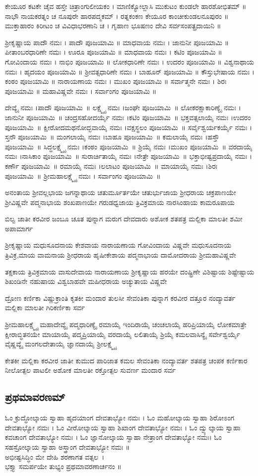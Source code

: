 ಕೇಯೂರ ಕಟಕೇ ಚೈವ ಹಸ್ತೇ ಚಿತ್ರಾಂಗುಲೀಯಕಂ । ಮಾಣಿಕ್ಯೋಲ್ಲಾಸಿ ಮುಕುಟಂ ಕುಂಡಲೇ ಹಾರಶೋಭಿತಮ್ ॥
ನಾಭೌ ನಾಯಕರತ್ನಂ ಚ ನೂಪುರೇ ಹಾರಪದ್ಮಕಮ್ । ರತ್ನಕಂಕಣ ಕೇಯೂರ ಕಾಂಚೀಕುಂಡಲನೂಪುರಂ ॥
ಮುಕ್ತಾಹಾರಂ ಕಿರೀಟಂ ಚ ವಿವಿಧಾಭರಣಾನಿ ಚ । ಗೃಹಾಣ ಭೂಷಣಂ ದೇವಿ ಸರ್ವಸಂಪತ್ಪ್ರದಾಯಿನಿ ॥

ಶ್ರೀಕೃಷ್ಣಾಯ ಪಾದೌ ನಮಃ । ಪಾದೌ ಪೂಜಯಾಮಿ ॥
ಮಾಧವಾಯ ನಮಃ । ಜಾನುನೀ ಪೂಜಯಾಮಿ ॥
ಪೀತಾಂಬರಧಾರಿಣೇ ನಮಃ । ಊರೂ ಪೂಜಯಾಮಿ ॥
ಮಾಧವಾಯ ನಮಃ । ಕಟಿಂ ಪೂಜಯಾಮಿ ॥
ಗೋವಿಂದಾಯ ನಮಃ । ನಾಭಿಂ ಪೂಜಯಾಮಿ ॥
ಲೋಕಧಾರಿಣೇ ನಮಃ । ಉದರಂ ಪೂಜಯಾಮಿ ॥
ವಿಶ್ವನಾಥಾಯ ನಮಃ । ಹೃದಯಂ ಪೂಜಯಾಮಿ ॥
ಶ್ರೀವತ್ಸಧಾರಿಣೇ ನಮಃ । ಬಾಹೂನ್ ಪೂಜಯಾಮಿ ॥
ಕೌಸ್ತುಭೇಷಾಯ ನಮಃ । ಕಂಠಂ ಪೂಜಯಾಮಿ ॥
ನಾರಾಯಣಾಯ ನಮಃ । ಮುಖಂ ಪೂಜಯಾಮಿ ॥
ಸರ್ವಾತ್ಮನೇ ನಮಃ । ಶಿರಃ ಪೂಜಯಾಮಿ ॥
ಮಹಾವಿಷ್ಣವೇ ನಮಃ । ಸರ್ವಾಂಗಂ ಪೂಜಯಾಮಿ  ॥

ದೇವ್ಯೈ ನಮಃ ।ಪಾದೌ ಪೂಜಯಾಮಿ~॥
ಲಕ್ಷ್ಮ್ಯೈ ನಮಃ ।ಜಂಘೇ ಪೂಜಯಾಮಿ~॥
ಲೋಕರಕ್ಷಾಕಾರಿಣ್ಯೈ ನಮಃ ।ಜಾನುನೀ ಪೂಜಯಾಮಿ~॥
ಚಂದ್ರಸಹೋದರ್ಯೈ ನಮಃ ।ಕಟಿಂ ಪೂಜಯಾಮಿ~॥
ಭಕ್ತವತ್ಸಲಾಯೈ ನಮಃ ।ಉದರಂ ಪೂಜಯಾಮಿ~॥
ಕ್ಷೀರೋದಮಥನೋದ್ಭವಾಯೈ ನಮಃ ।ವಕ್ಷಸ್ಥಲಂ ಪೂಜಯಾಮಿ~॥
ಸರ್ವೈಶ್ವರ್ಯಕರ್ಯೈ ನಮಃ ।ಸ್ತನೌ ಪೂಜಯಾಮಿ~॥
ಮಂಗಲಾಯೈ ನಮಃ ।ಬಾಹೂ ಪೂಜಯಾಮಿ~॥
ಕಮಲಾಯೈ ನಮಃ ।ಹಸ್ತೌ ಪೂಜಯಾಮಿ~॥
ಸಿದ್ಧಲಕ್ಷ್ಮ್ಯೈ ನಮಃ ।ಕಂಠಂ ಪೂಜಯಾಮಿ~॥
ಶ್ರಿಯೈ ನಮಃ ।ಮುಖಂ ಪೂಜಯಾಮಿ~॥
ವರದಾಯೈ ನಮಃ ।ನಾಸಿಕಾಂ ಪೂಜಯಾಮಿ~॥
ಸುರಾರ್ಚಿತಾಯೈ ನಮಃ ।ನೇತ್ರೇ ಪೂಜಯಾಮಿ~॥
ಭಕ್ತಾಭೀಷ್ಟಪ್ರದಾಯೈ ನಮಃ ।ಕರ್ಣೌ ಪೂಜಯಾಮಿ~॥
ರಮಾಯೈ ನಮಃ ।ಲಲಾಟಂ ಪೂಜಯಾಮಿ~॥
ಮಾಯಾಯೈ ನಮಃ ।ಶಿರಃ ಪೂಜಯಾಮಿ~॥
ಶ್ರೀಮಹಾಲಕ್ಷ್ಮ್ಯೈ ನಮಃ । ಸರ್ವಾಂಗಂ ಪೂಜಯಾಮಿ~॥

ಅನಂತಾಯ ಶ್ರೀವಲ್ಲಭಾಯ ಜಗನ್ನಾಥಾಯ ಚತುರ್ಮೂರ್ತಯೇ ಚತುರ್ಭುಜಾಯ ಶ್ರೀಧರಾಯ ಚಕ್ರಪಾಣಯೇ ಶ್ರೀವಿಷ್ಣವೇ ಪದ್ಮನಾಭಾಯ ಶಂಖಪಾಣಯೇ ಗರುಡಧ್ವಜಾಯ ತ್ರಿವಿಕ್ರಮಾಯ ನಾರಸಿಂಹಾಯ ಕಾಮರೂಪಾಯ

ಬಿಲ್ವ ಜಾತೀ ಕರವೀರ ಜಂಬೂ ಚೂತ  ಪುನ್ನಾಗ ಮರುಗ ದೇವದಾರು ಅಶೋಕ ಶತಪತ್ರ ಮಲ್ಲಿಕಾ ಮಾಲತೀ ಶಮೀ  ಅಪಾಮಾರ್ಗ

ಶ್ರೀಕೃಷ್ಣಾಯ ಮಧುಸೂದನಾಯ ಕೇಶವಾಯ ನಾರಾಯಣಾಯ ಗೋವಿಂದಾಯ ವಿಷ್ಣವೇ ಮಧುಸೂದನಾಯ ತ್ರಿವಿಕ್ರ,ಮಾಯ ವಾಮನಾಯ ಶ್ರೀಧರಾಯ ಹೃಷೀಕೇಶಾಯ ಪದ್ಮನಾಭಾಯ ದಾಮೋದರಾಯ ಶ್ರೀಮಹಾವಿಷ್ಣವೇ

ತಕ್ಷಕಾಯ ತ್ರಿವಿಕ್ರಮಾಯ ವಾಸುದೇವಾಯ ನಾರಾಯಣಾಯ ಶ್ರೀಕೃಷ್ಣಾಯ ಹರಯೇ ದಂಷ್ಟ್ರಿಣೇ ವಿಶಿಷ್ಟಾಯ ಶಿಷ್ಟೇಷ್ಟಾಯ ಶಿಖಂಡಿನೇ ನಹುಷಾಯ ವಿಶ್ವಬಾಹವೇ ಮಹೀಧರಾಯ ಅಚ್ಯುತಾಯ ವಿಷ್ಣವೇ

ದ್ರೋಣ ಕರ್ಣಿಕಾ ವಿಷ್ಣುಕ್ರಾಂತಿ ಕೃತಕೀ ಮಂದಾರ ತುಲಸೀ ಸೇವಂತಿಕಾ ಪುನ್ನಾಗ ಕರವೀರ ದತ್ತೂರ ನಂದ್ಯಾವರ್ತ ಮಲ್ಲಿಕಾ ಮಾಲತೀ ಗಿರಿಕರ್ಣಿಕಾ ಸರ್ವ

ಶ್ರೀಮಹಾಲಕ್ಷ್ಮ್ಯೈ ಮಹಾದೇವ್ಯೈ  ಪದ್ಮಧಾರಿಣ್ಯೈ ರಮಾಯೈ ಇಂದಿರಾಯೈ ಚಂಚಲಾಯೈ ಹರಿಪ್ರಿಯಾಯೈ ಲೋಕಮಾತ್ರೇ ಕ್ಷೀರಾಬ್ಧಿತನಯೇ ಮಾಯಾಯೈ ಪದ್ಮಪ್ರಿಯಾಯೈ ವರದಾಯೈ ಲಲಿತಾಯೈ ಶ್ರಿಯೈ ಕಮಲವಾಸಿನ್ಯೈ ಸರ್ವೇಶ್ವರ್ಯೈ ವೈಷ್ಣವ್ಯೈ ಮಂಗಲದೇತಾಯೈ ಜ್ಞಾನದಾಯೈ ಶ್ರೀಲಕ್ಷ್ಮ್ಯೈ 

ಕೇತಕೀ ಮಲ್ಲಿಕಾ ಕರವೀರ ಜಾತೀ ಕುಮುದ ಪಾರಿಜಾತ ಕಮಲ ಸೇವಂತಿಕಾ ನಂದ್ಯಾವರ್ತ ಶತಪತ್ರ ಚಂಪಕ ಕರ್ಣಿಕಾರ ನೀಲೋತ್ಪಲ ಪಾಟಲೀ  ಅಶೋಕ ಮಾಲತೀ ರಕ್ತೋತ್ಪಲ ಸುವರ್ಣ ಮಂದಾರ ಸರ್ವ


\subsection{ಪ್ರಥಮಾವರಣಮ್}
ಓಂ ಕ್ರುದ್ಧೋಲ್ಕಾಯ ಸ್ವಾಹಾ ಹೃದಯಾಂಗ ದೇವತಾಭ್ಯೋ ನಮಃ । ಓಂ ಮಹೋಲ್ಕಾಯ ಸ್ವಾಹಾ ಶಿರೋಽಂಗ ದೇವತಾಭ್ಯೋ ನಮಃ । ಓಂ ವೀರೋಲ್ಕಾಯ ಸ್ವಾಹಾ ಶಿಖಾಂಗ ದೇವತಾಭ್ಯೋ ನಮಃ । ಓಂ ದ್ವ್ಯುಲ್ಕಾಯ ಸ್ವಾಹಾ ಕವಚಾಂಗ ದೇವತಾಭ್ಯೋ ನಮಃ । ಓಂ ಜ್ಞಾನೋಲ್ಕಾಯ ಸ್ವಾಹಾ ನೇತ್ರಾಂಗ ದೇವತಾಭ್ಯೋ ನಮಃ। ಓಂ ಸಹಸ್ರೋಲ್ಕಾಯ ಸ್ವಾಹಾ ಅಸ್ತ್ರಾಂಗ ದೇವತಾಭ್ಯೋ ನಮಃ ॥\\
ಅಭೀಷ್ಟಸಿದ್ಧಿಂ ಮೇ ದೇಹಿ ಶರಣಾಗತ ವತ್ಸಲ~।\\
ಭಕ್ತ್ಯಾ ಸಮರ್ಪಯೇ ತುಭ್ಯಂ ಪ್ರಥಮಾವರಣಾರ್ಚನಂ ॥

